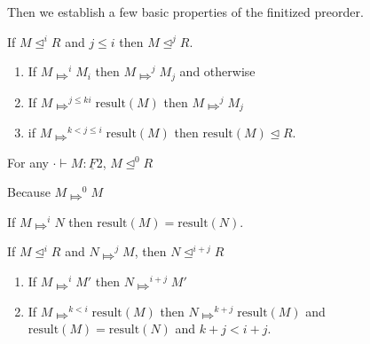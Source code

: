 \documentclass[acmsmall,screen,12pt]{acmart}
\renewcommand{\u}{\underline}
\newcommand{\apreorder}{\trianglelefteq}
\newcommand{\ix}[2]{\mathrel{#1^{#2}}}
\newcommand{\bigstepsin}[1]{\mathrel{\Mapsto^{#1}}}
\newcommand{\result}{\text{result}}
\begin{document}
{\begin{longonly}
Then we establish a few basic properties of the finitized preorder.
\begin{lemma}
  If $M \ix\apreorder i R$ and $j\leq i$ then $M \ix \apreorder j R$.
\end{lemma}
\begin{longproof} \hfill
  \begin{enumerate}
  \item If $M \bigstepsin{i} M_i$ then $M \bigstepsin{j} M_j$ and otherwise 
  \item If $M \bigstepsin{j \leq k i} \result(M)$ then $M \bigstepsin{j} M_j$
  \item if $M \bigstepsin{k < j \leq i} \result(M)$ then $\result(M) \apreorder R$.
  \end{enumerate}
\end{longproof}
\begin{lemma}[Triviality at $0$]
  For any $\cdot \vdash M : \u F 2$, $M \ix\apreorder 0 R$
\end{lemma}
\begin{longproof}
  Because $M \bigstepsin{0} M$
\end{longproof}
\begin{lemma}
  If $M \bigstepsin{i} N$ then $\result(M) = \result(N)$.
\end{lemma}
\begin{lemma}
  If $M \ix\apreorder i R$ and $N \bigstepsin{j} M$, then $N \ix\apreorder {{i+j}} R$
\end{lemma}
\begin{longproof}
  \begin{enumerate}
  \item If $M \bigstepsin{i} M'$ then $N \bigstepsin{i+j} M'$
  \item If $M \bigstepsin{k < i} \result(M)$ then $N \bigstepsin{k+j}
    \result(M)$ and $\result(M) = \result(N)$ and $k+j < i+j$.
  \end{enumerate}
\end{longproof}
\end{longonly}

}
\end{document}
